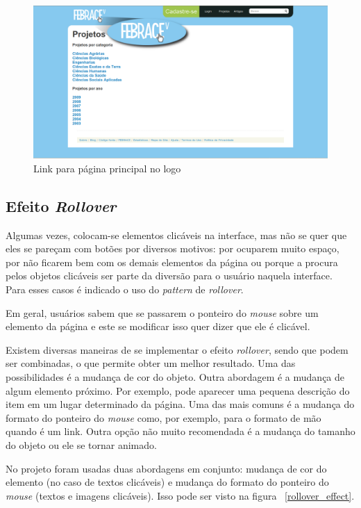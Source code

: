     \begin{figure}[h]
        \begin{center}
    \includegraphics[width=1.0\linewidth]{arquivos/home_link.png}
        \end{center}
        \caption{Link para página principal no logo}
        \label{home_link}
    \end{figure}

\subsection{Efeito \textit{Rollover}}

Algumas vezes, colocam-se elementos clicáveis na interface, mas não se quer que eles se pareçam com botões por diversos motivos: por ocuparem muito espaço, por não ficarem bem com os demais elementos da página ou porque a procura pelos objetos clicáveis ser parte da diversão para o usuário naquela interface. Para esses casos é indicado o uso do \textit{pattern} de \textit{rollover}.

Em geral, usuários sabem que se passarem o ponteiro do \textit{mouse} sobre um elemento da página e este se modificar isso quer dizer que ele é clicável.

Existem diversas maneiras de se implementar o efeito \textit{rollover}, sendo que podem ser combinadas, o que permite obter um melhor resultado. Uma das possibilidades é a mudança de cor do objeto. Outra abordagem é a mudança de algum elemento próximo. Por exemplo, pode aparecer uma pequena descrição do item em um lugar determinado da página. Uma das mais comuns é a mudança do formato do ponteiro do \textit{mouse} como, por exemplo, para o formato de mão quando é um link. Outra opção não muito recomendada é a mudança do tamanho do objeto ou ele se tornar animado.

No projeto foram usadas duas abordagens em conjunto: mudança de cor do elemento (no caso de textos clicáveis) e mudança do formato do ponteiro do \textit{mouse} (textos e imagens clicáveis). Isso pode ser visto na figura ~\ref{rollover_effect}.

